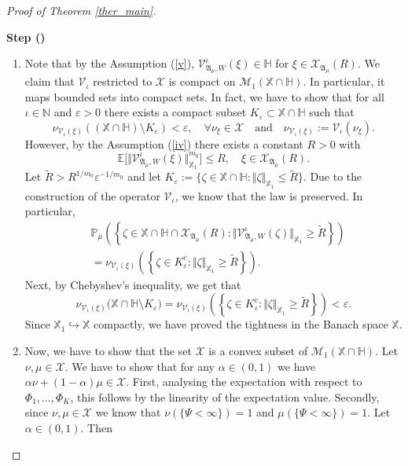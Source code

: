 \documentclass[english,a4paper,11pt]{amsart}
\theoremstyle{plain}
\theoremstyle{definition}
\theoremstyle{remark}
\numberwithin{equation}{section}
\newcounter{lil1}
\newenvironment{step}
{\begin{list} { \bf Step (\Roman{lil1})}
		{ \usecounter{lil1}
			\setlength{\leftmargin}{0.0cm}
			\setlength{\topsep}{0.2cm}
			\setlength{\itemsep}{0.0cm}
			\setlength{\parsep}{0.1cm}
			\setlength{\itemindent}{0.8cm}
			\setlength{\parskip}{0.0cm}}}
	{\end{list}}
\newcounter{lil33}
\newcounter{lil1q}
\newcommand{\ep} {\varepsilon }
\newcommand{\NN}{\mathbb{N}}
\newcommand{\PP}{{\mathbb{P}}}
\newcommand{\EE}{ \mathbb{E} }
\newcommand{\X}{\mathbb{X}}
\begin{document}
\begin{proof}[Proof of Theorem \ref{ther_main}]
\begin{step}
\begin{enumerate}[(1)]
\item\label{3p} Note that by the Assumption (\ref{v}), $\mathcal{V}^\iota_{\mathfrak{A}_\mu,W}(\xi)\in \mathbb{H}$ for $\xi\in\mathcal{X}_{\mathfrak{A}_\mu}(R)$. We claim that $\mathscr{V}_\iota$ restricted to $\mathscr{X}$ is compact on $\mathscr{M}_1(\mathbb{X}\cap\mathbb{H})$. 
In particular, it maps bounded sets into compact sets.
In fact, we have to show that for all $\iota\in\NN$ and $\ep>0$ there exists a compact subset $K_\ep\subset\mathbb{X}\cap\mathbb{H}$ such that
$$
\nu_ {\mathscr{V}_\iota(\xi)}\left ((\mathbb{X}\cap\mathbb{H})\setminus K_\ep\right)< \ep, \quad \forall {\nu_\xi\in \mathscr{X}}\quad \mbox{and}\quad \nu_ {\mathscr{V}_\iota(\xi)}:=\mathscr{V}_\iota(\nu_\xi).
$$
However, by the Assumption (\ref{iv})
there exists a constant $R>0$ with
$$
\EE\big[\Vert\mathcal{V}^\iota_{\mathfrak{A}_\mu,W}(\xi)\Vert_{\mathbb{X}_1}^{m_0}\big]\le R,\quad \xi\in\mathcal{X}_{\mathfrak{A}_\mu}(R).
$$
Let $\tilde{R}>R^{1/{m_0}}\ep^{-1/{m_0}}$
and let $K_\ep:=\{\zeta \in\mathbb{X}\cap\mathbb{H}:\Vert \zeta \Vert_{\mathbb{X}_1}\le \tilde{R}\}$.
Due to the construction of the operator $\mathscr{V}_\iota$, we know
that the law is preserved. In particular,
\begin{align*}
&\PP_\mu\left(  \left\{
\zeta\in\mathbb{X}\cap\mathbb{H}\cap \mathcal{X}_{\mathfrak{A}_\mu}(R) :\Vert\mathcal{V}_{\mathfrak{A}_\mu,W}^\iota(\zeta)\Vert_{\mathbb{X}_1} \ge \tilde{R}\right\} \right)
\\&=\nu_ {\mathscr{V}_\iota(\xi)}\left ( {{\left\{
		\zeta\in K_\ep^c:\Vert \zeta\Vert_{\mathbb{X}_1} \ge \tilde{R}\right\}}}\right).
\end{align*}
Next, by Chebyshev's inequality, we get that
$$\nu_{ \mathscr{V}_\iota(\xi)}\big(\mathbb{X}\cap\mathbb{H}\setminus K_\ep\big)
=
\nu_ {\mathscr{V}_\iota(\xi)}\left( \left\{
		\zeta\in K_\ep^c:\Vert \zeta\Vert_{\mathbb{X}_1} \ge \tilde{R}\right\}\right)
< \ep.$$
%
Since $\mathbb{X}_1\hookrightarrow \mathbb{X}$ compactly,
we have proved the tightness in the Banach space $\X$.
%
\item\label{4p} Now, we have to show that the set $\mathscr{X}$ is a convex subset of $\mathscr{M}_1(\mathbb{X}\cap\mathbb{H})$.
Let $\nu,\mu\in\mathscr{X}$. We have to show that for any $\alpha\in(0,1)$ we have $\alpha \nu+(1-\alpha)\mu\in\mathscr{X}$. 
First, analysing the expectation with respect to $\Phi_1,\ldots,\Phi_K$, this follows by the linearity of the expectation value. Secondly, since $\nu,\mu\in\mathscr{X}$
we know that $\nu\left(\{\Psi<\infty\}\right)=1$ and $\mu\left(\{\Psi<\infty\}\right)=1$. Let $\alpha\in(0,1)$. Then

\end{enumerate}
\end{step}
\end{proof}
\end{document}

